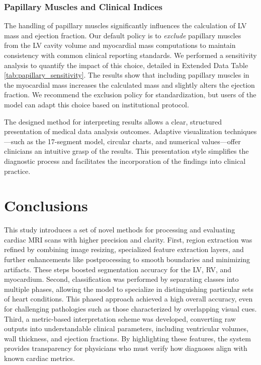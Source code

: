 \documentclass[fleqn,10pt]{wlscirep}
\begin{document}
\subsubsection*{Papillary Muscles and Clinical Indices}
The handling of papillary muscles significantly influences the calculation of LV mass and ejection fraction. Our default policy is to \emph{exclude} papillary muscles from the LV cavity volume and myocardial mass computations to maintain consistency with common clinical reporting standards. We performed a sensitivity analysis to quantify the impact of this choice, detailed in Extended Data Table \ref{tab:papillary_sensitivity}. The results show that including papillary muscles in the myocardial mass increases the calculated mass and slightly alters the ejection fraction. We recommend the exclusion policy for standardization, but users of the model can adapt this choice based on institutional protocol.

The designed method for interpreting results allows a clear, structured presentation of medical data analysis outcomes. Adaptive visualization techniques---such as the 17-segment model, circular charts, and numerical values---offer clinicians an intuitive grasp of the results. This presentation style simplifies the diagnostic process and facilitates the incorporation of the findings into clinical practice.

\section*{Conclusions}

This study introduces a set of novel methods for processing and evaluating cardiac MRI scans with higher precision and clarity. First, region extraction was refined by combining image resizing, specialized feature extraction layers, and further enhancements like postprocessing to smooth boundaries and minimizing artifacts. These steps boosted segmentation accuracy for the LV, RV, and myocardium. Second, classification was performed by separating classes into multiple phases, allowing the model to specialize in distinguishing particular sets of heart conditions. This phased approach achieved a high overall accuracy, even for challenging pathologies such as those characterized by overlapping visual cues. Third, a metric-based interpretation scheme was developed, converting raw outputs into understandable clinical parameters, including ventricular volumes, wall thickness, and ejection fractions. By highlighting these features, the system provides transparency for physicians who must verify how diagnoses align with known cardiac metrics.
\end{document}
